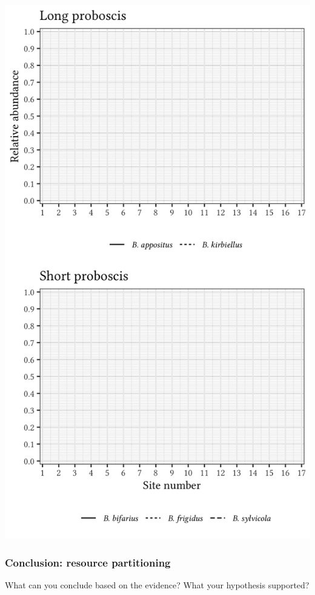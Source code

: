 \documentclass[12pt, hidelinks]{exam}
\begin{document}
\begin{questions}
\else
	\includegraphics[height =\textheight]{gothic_relative_abundance_blank}
\fi



\subsubsection*{Conclusion: resource partitioning}

\question[Checkout]
What can you conclude based on the evidence? What your hypothesis supported?


\end{questions}
\end{document}
